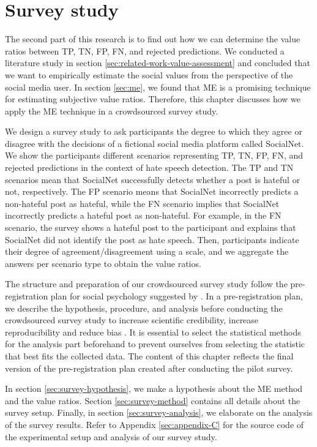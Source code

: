 \chapter{Survey study}
\label{ch:survey}
The second part of this research is to find out how we can determine the value ratios between TP, TN, FP, FN, and rejected predictions.
%
We conducted a literature study in section \ref{sec:related-work-value-assessment} and concluded that we want to empirically estimate the social values from the perspective of the social media user.
%
In section \ref{sec:me}, we found that ME is a promising technique for estimating subjective value ratios.
%
Therefore, this chapter discusses how we apply the ME technique in a crowdsourced survey study.
%

%
We design a survey study to ask participants the degree to which they agree or disagree with the decisions of a fictional social media platform called SocialNet.
%
We show the participants different scenarios representing TP, TN, FP, FN, and rejected predictions in the context of hate speech detection.
%
The TP and TN scenarios mean that SocialNet successfully detects whether a post is hateful or not, respectively.
%
The FP scenario means that SocialNet incorrectly predicts a non-hateful post as hateful, while the FN scenario implies that SocialNet incorrectly predicts a hateful post as non-hateful.
%
For example, in the FN scenario, the survey shows a hateful post to the participant and explains that SocialNet did not identify the post as hate speech.
%
Then, participants indicate their degree of agreement/disagreement using a scale, and we aggregate the answers per scenario type to obtain the value ratios.
%

%
The structure and preparation of our crowdsourced survey study follow the pre-registration plan for social psychology suggested by \citet{van2016pre}.
%
In a pre-registration plan, we describe the hypothesis, procedure, and analysis before conducting the crowdsourced survey study to increase scientific credibility, increase reproducibility and reduce bias \citep{van2016pre}.
%
It is essential to select the statistical methods for the analysis part beforehand to prevent ourselves from selecting the statistic that best fits the collected data.
%
The content of this chapter reflects the final version of the pre-registration plan created after conducting the pilot survey.
%

%
In section \ref{sec:survey-hypothesis}, we make a hypothesis about the ME method and the value ratios.
%
Section \ref{sec:survey-method} contains all details about the survey setup.
%
Finally, in section \ref{sec:survey-analysis}, we elaborate on the analysis of the survey results.
%
Refer to Appendix \ref{sec:appendix-C} for the source code of the experimental setup and analysis of our survey study.

